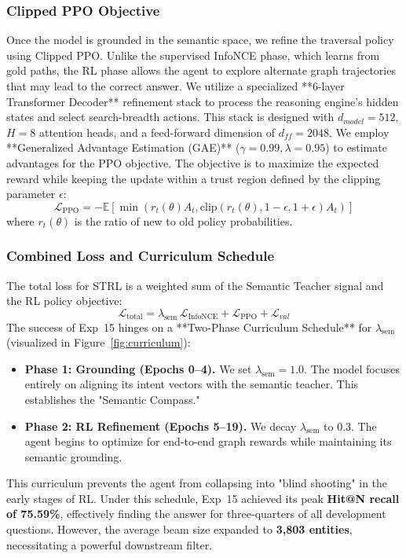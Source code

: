 \documentclass[11pt,a4paper]{article}
\begin{document}
\subsubsection{Clipped PPO Objective}
Once the model is grounded in the semantic space, we refine the traversal policy using Clipped PPO. Unlike the supervised InfoNCE phase, which learns from gold paths, the RL phase allows the agent to explore alternate graph trajectories that may lead to the correct answer. We utilize a specialized **6-layer Transformer Decoder** refinement stack to process the reasoning engine's hidden states and select search-breadth actions. This stack is designed with $d_{model}=512$, $H=8$ attention heads, and a feed-forward dimension of $d_{ff}=2048$. We employ **Generalized Advantage Estimation (GAE)** ($\gamma=0.99, \lambda=0.95$) to estimate advantages for the PPO objective.
The objective is to maximize the expected reward while keeping the update
within a trust region defined by the clipping parameter $\epsilon$:
\begin{equation}
    \mathcal{L}_{\mathrm{PPO}} = -\mathbb{E} [ \min(r_t(\theta) A_t, \text{clip}(r_t(\theta), 1-\epsilon, 1+\epsilon) A_t) ]
\end{equation}
where $r_t(\theta)$ is the ratio of new to old policy probabilities.

\subsubsection{Combined Loss and Curriculum Schedule}
The total loss for STRL is a weighted sum of the Semantic Teacher signal and
the RL policy objective:
\begin{equation}
    \mathcal{L}_{\mathrm{total}} = \lambda_{\mathrm{sem}}\,\mathcal{L}_{\mathrm{InfoNCE}} + \mathcal{L}_{\mathrm{PPO}} + \mathcal{L}_{val}
\end{equation}
The success of Exp~15 hinges on a **Two-Phase Curriculum Schedule** for
$\lambda_{\mathrm{sem}}$ (visualized in Figure~\ref{fig:curriculum}):
\begin{itemize}
    \item \textbf{Phase 1: Grounding (Epochs 0--4).} We set
          $\lambda_{\mathrm{sem}}=1.0$. The model focuses entirely on
          aligning its intent vectors with the semantic teacher. This
          establishes the "Semantic Compass."
    \item \textbf{Phase 2: RL Refinement (Epochs 5--19).} We decay
          $\lambda_{\mathrm{sem}}$ to $0.3$. The agent begins to optimize for
          end-to-end graph rewards while maintaining its semantic grounding.
\end{itemize}
This curriculum prevents the agent from collapsing into "blind shooting" in
the early stages of RL. Under this schedule, Exp~15 achieved its peak
\textbf{Hit@N recall of 75.59\%}, effectively finding the answer for
three-quarters of all development questions. However, the average beam size
expanded to \textbf{3,803 entities}, necessitating a powerful downstream
filter.
\end{document}
